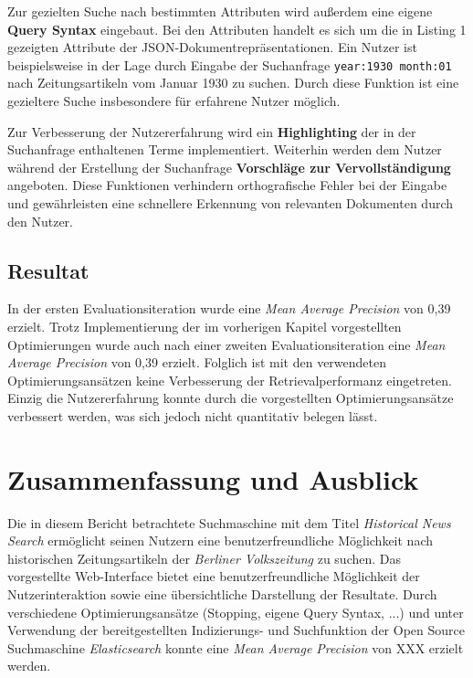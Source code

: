 \documentclass[11pt,a4paper, halfparskip]{scrartcl}
\begin{document}
Zur gezielten Suche nach bestimmten Attributen wird außerdem eine eigene \textbf{Query Syntax} eingebaut. 
Bei den Attributen handelt es sich um die in Listing 1 gezeigten Attribute der JSON-Dokumentrepräsentationen.
Ein Nutzer ist beispielsweise in der Lage durch Eingabe der Suchanfrage \texttt{year:1930 month:01} nach Zeitungsartikeln vom Januar 1930 zu suchen.
Durch diese Funktion ist eine gezieltere Suche insbesondere für erfahrene Nutzer möglich.

Zur Verbesserung der Nutzererfahrung wird ein \textbf{Highlighting} der in der Suchanfrage enthaltenen Terme implementiert.
Weiterhin werden dem Nutzer während der Erstellung der Suchanfrage \textbf{Vorschläge zur Vervollständigung} angeboten.
Diese Funktionen verhindern orthografische Fehler bei der Eingabe und gewährleisten eine schnellere Erkennung von relevanten Dokumenten durch den Nutzer.

\subsection{Resultat}

In der ersten Evaluationsiteration wurde eine \textit{Mean Average Precision} von 0,39 erzielt.
Trotz Implementierung der im vorherigen Kapitel vorgestellten Optimierungen wurde auch nach einer zweiten Evaluationsiteration eine \textit{Mean Average Precision} von 0,39 erzielt.
Folglich ist mit den verwendeten Optimierungsansätzen keine Verbesserung der Retrievalperformanz eingetreten.
Einzig die Nutzererfahrung konnte durch die vorgestellten Optimierungsansätze verbessert werden, was sich jedoch nicht quantitativ belegen lässt.

\section{Zusammenfassung und Ausblick}

Die in diesem Bericht betrachtete Suchmaschine mit dem Titel \textit{Historical News Search} ermöglicht seinen Nutzern eine benutzerfreundliche Möglichkeit nach historischen Zeitungsartikeln der \textit{Berliner Volkszeitung} zu suchen.
Das vorgestellte Web-Interface bietet eine benutzerfreundliche Möglichkeit der Nutzerinteraktion sowie eine übersichtliche Darstellung der Resultate.
Durch verschiedene Optimierungsansätze (Stopping, eigene Query Syntax, ...) und unter Verwendung der bereitgestellten Indizierungs- und Suchfunktion der Open Source Suchmaschine \textit{Elasticsearch} konnte eine \textit{Mean Average Precision} von XXX erzielt werden.
\end{document}

